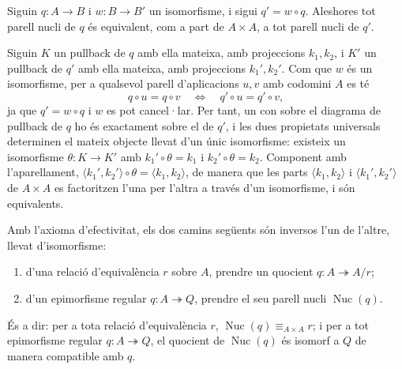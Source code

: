 \begin{lema}\label{lema:nucli-invariant}
Siguin \(q\colon A\to B\) i \(w\colon B\to B'\) un isomorfisme, i sigui \(q'=w\circ q\). Aleshores tot parell nucli de \(q\) és equivalent, com a part de \(A\times A\), a tot parell nucli de \(q'\).
\end{lema}

\begin{prova}
Siguin \(K\) un pullback de \(q\) amb ella mateixa, amb projeccions \(k_1,k_2\), i \(K'\) un pullback de \(q'\) amb ella mateixa, amb projeccions \(k_1',k_2'\). Com que \(w\) és un isomorfisme, per a qualsevol parell d'aplicacions \(u,v\) amb codomini \(A\) es té
\[
q\circ u=q\circ v
\quad\Longleftrightarrow\quad
q'\circ u=q'\circ v,
\]
ja que \(q'=w\circ q\) i \(w\) es pot cancel·lar. Per tant, un con sobre el diagrama de pullback de \(q\) ho és exactament sobre el de \(q'\), i les dues propietats universals determinen el mateix objecte llevat d'un únic isomorfisme: existeix un isomorfisme \(\theta\colon K\to K'\) amb \(k_1'\circ\theta=k_1\) i \(k_2'\circ\theta=k_2\). Component amb l'aparellament, \(\langle k_1',k_2'\rangle\circ\theta=\langle k_1,k_2\rangle\), de manera que les parts \(\langle k_1,k_2\rangle\) i \(\langle k_1',k_2'\rangle\) de \(A\times A\) es factoritzen l'una per l'altra a través d'un isomorfisme, i són equivalents.
\end{prova}

\begin{teorema}\label{teo:correspondencia}
Amb l'axioma d'efectivitat, els dos camins següents són inversos l'un de l'altre, llevat d'isomorfisme:
\begin{enumerate}
\item d'una relació d'equivalència \(r\) sobre \(A\), prendre un quocient \(q\colon A\twoheadrightarrow A/r\);
\item d'un epimorfisme regular \(q\colon A\twoheadrightarrow Q\), prendre el seu parell nucli \(\operatorname{Nuc}(q)\).
\end{enumerate}
És a dir: per a tota relació d'equivalència \(r\), \(\operatorname{Nuc}(q)\equiv_{A\times A} r\); i per a tot epimorfisme regular \(q\colon A\twoheadrightarrow Q\), el quocient de \(\operatorname{Nuc}(q)\) és isomorf a \(Q\) de manera compatible amb \(q\).
\end{teorema}


